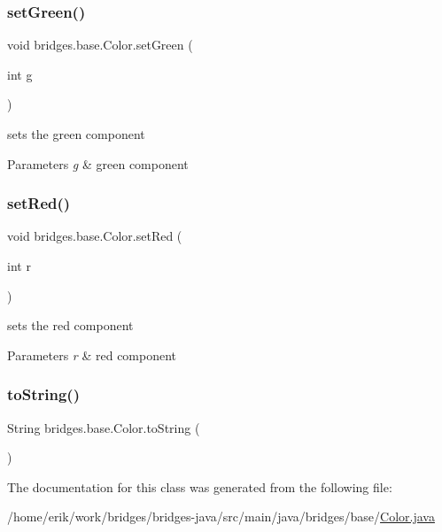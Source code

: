 \subsubsection{\texorpdfstring{set\+Green()}{setGreen()}}
{\footnotesize\ttfamily void bridges.\+base.\+Color.\+set\+Green (\begin{DoxyParamCaption}\item[{int}]{g }\end{DoxyParamCaption})}

sets the green component


\begin{DoxyParams}{Parameters}
{\em g} & green component \\
\hline
\end{DoxyParams}
\mbox{\label{classbridges_1_1base_1_1_color_a1d78967703924b709e76def5b2b3ee9a}} 
\subsubsection{\texorpdfstring{set\+Red()}{setRed()}}
{\footnotesize\ttfamily void bridges.\+base.\+Color.\+set\+Red (\begin{DoxyParamCaption}\item[{int}]{r }\end{DoxyParamCaption})}

sets the red component


\begin{DoxyParams}{Parameters}
{\em r} & red component \\
\hline
\end{DoxyParams}
\mbox{\label{classbridges_1_1base_1_1_color_a62e7406ca7d36ed755c28a86376328ba}} 
\subsubsection{\texorpdfstring{to\+String()}{toString()}}
{\footnotesize\ttfamily String bridges.\+base.\+Color.\+to\+String (\begin{DoxyParamCaption}{ }\end{DoxyParamCaption})}



The documentation for this class was generated from the following file\+:\begin{DoxyCompactItemize}
\item 
/home/erik/work/bridges/bridges-\/java/src/main/java/bridges/base/\hyperlink{_color_8java}{Color.\+java}\end{DoxyCompactItemize}
